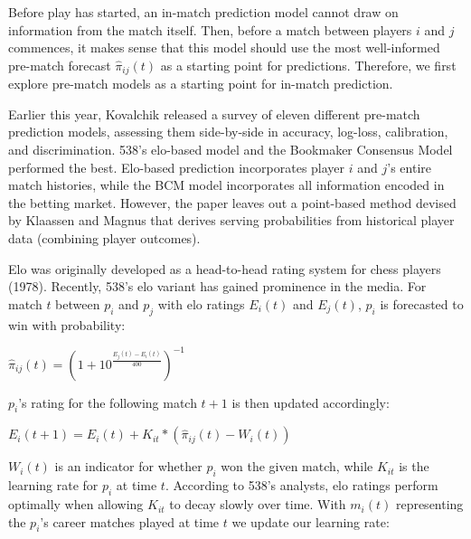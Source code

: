 \documentclass[11pt]{article}
\begin{document}

Before play has started, an in-match prediction model cannot draw on information from the match itself. Then, before a match between players $i$ and $j$ commences, it makes sense that this model should use the most well-informed pre-match forecast $\hat{\pi}_{ij}(t)$ as a starting point for predictions. Therefore, we first explore pre-match models as a starting point for in-match prediction.

Earlier this year, Kovalchik released a survey of eleven different pre-match prediction models, assessing them side-by-side in accuracy, log-loss, calibration, and discrimination. 538's elo-based model and the Bookmaker Consensus Model performed the best. Elo-based prediction incorporates player $i$ and $j$'s entire match histories, while the BCM model incorporates all information encoded in the betting market. However, the paper leaves out a point-based method  devised by Klaassen and Magnus that derives serving probabilities from historical player data (combining player outcomes).


\item Elo was originally developed as a head-to-head rating system for chess players (1978). Recently, 538's elo variant has gained prominence in the media. For match $t$ between $p_i$ and $p_j$ with elo ratings $E_i(t)$ and $E_j(t)$, $p_i$ is forecasted to win with probability:

$\hat{\pi}_{ij}(t) = (1 + 10^\frac{E_j(t)-E_i(t)}{400})^{-1}$


$p_i$'s rating for the following match $t+1$ is then updated accordingly:

$E_i(t+1) = E_i(t) + K_{it}*(\hat{\pi}_{ij}(t)-W_i(t))$

$W_i(t)$ is an indicator for whether $p_i$ won the given match, while $K_{it}$ is the learning rate for $p_i$ at time $t$. According to 538's analysts, elo ratings perform optimally when allowing $K_{it}$ to  decay slowly over time. With $m_i(t)$ representing the $p_i$'s career matches played at time $t$ we update our learning rate:
\end{document}
